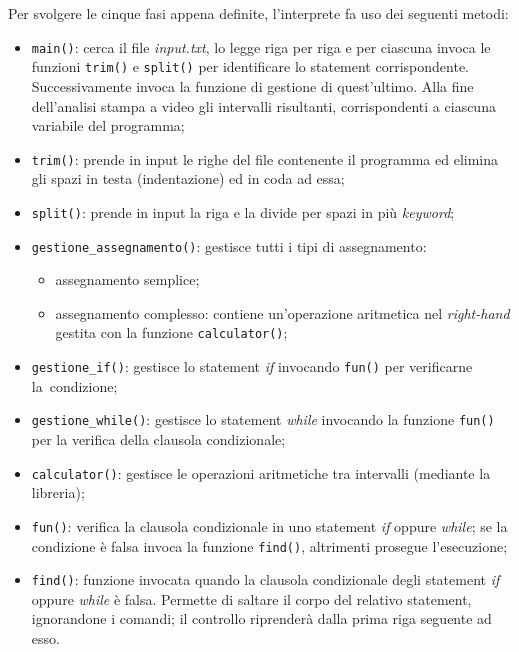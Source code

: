 \documentclass[a4paper, 10pt]{report}
\begin{document}
\noindent
Per svolgere le cinque fasi appena definite, l'interprete fa uso dei seguenti metodi:
\begin{itemize}
	\item \verb|main()|: cerca il file \textit{input.txt}, lo legge riga per riga e per ciascuna invoca le funzioni \verb|trim()| e \verb|split()| per identificare lo statement corrispondente. Successivamente invoca la funzione di gestione di quest'ultimo. Alla fine dell'analisi stampa a video gli intervalli risultanti, corrispondenti a ciascuna variabile del programma;
	\item \verb|trim()|: prende in input le righe del file contenente il programma ed elimina gli spazi in testa (indentazione) ed in coda ad essa;
	\item \verb|split()|: prende in input la riga e la divide per spazi in più \textit{keyword};
	\item \verb|gestione_assegnamento()|: gestisce tutti i tipi di assegnamento:
	\begin{itemize}
		\item assegnamento semplice;
		\item assegnamento complesso: contiene un'operazione aritmetica nel \textit{right-hand} gestita con la funzione \verb|calculator()|;
	\end{itemize}
	\item \verb|gestione_if()|: gestisce lo statement \textit{if} invocando \verb|fun()| per verificarne la~condizione;
	\item \verb|gestione_while()|: gestisce lo statement \textit{while} invocando la funzione \verb|fun()| per la verifica della clausola condizionale;
	\item \verb|calculator()|: gestisce le operazioni aritmetiche tra intervalli (mediante la libreria);
	\item \verb|fun()|: verifica la clausola condizionale in uno statement \textit{if} oppure \textit{while}; se la condizione è falsa invoca la funzione \verb|find()|, altrimenti prosegue l'esecuzione;
	\item \verb|find()|: funzione invocata quando la clausola condizionale degli statement \textit{if} oppure \textit{while} è falsa. Permette di saltare il corpo del relativo statement, ignorandone i comandi; il controllo riprenderà dalla prima riga seguente ad esso.
\end{itemize}
\end{document}
